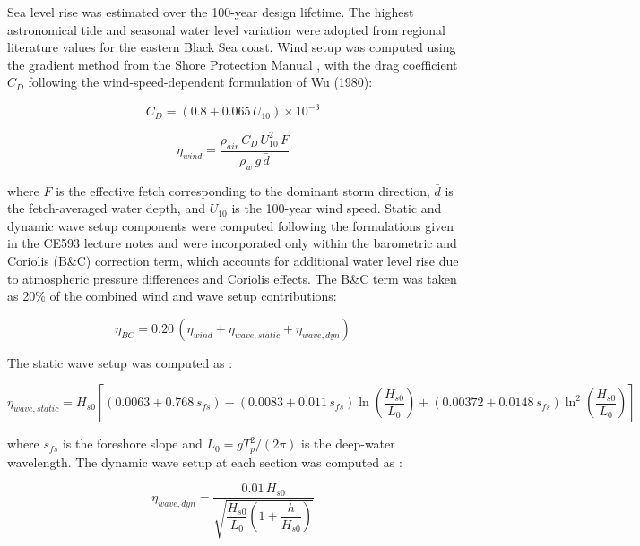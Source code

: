 \documentclass[a4paper, 11pt]{article}
\begin{document}
Sea level rise was estimated over the 100-year design lifetime. The highest astronomical tide and seasonal water level variation were adopted from regional literature values for the eastern Black Sea coast. Wind setup was computed using the 
gradient method from the Shore Protection Manual \cite{SPM1984}, 
with the drag coefficient $C_D$ following the wind-speed-dependent 
formulation of Wu (1980):

\begin{equation}
    C_D = (0.8 + 0.065\,U_{10}) \times 10^{-3}
\end{equation}

\begin{equation}
    \eta_{wind} = \frac{\rho_{air}\,C_D\,U_{10}^2\,F}
    {\rho_w\,g\,\bar{d}}
\end{equation}

where $F$ is the effective fetch corresponding to the dominant storm 
direction, $\bar{d}$ is the fetch-averaged water depth, and $U_{10}$ 
is the 100-year wind speed. Static and dynamic wave setup components were computed following the formulations given in the CE593 lecture notes \cite{CE593} and were incorporated only within the barometric and Coriolis 
(B\&C) correction term, which accounts for additional water level 
rise due to atmospheric pressure differences and Coriolis effects. 
The B\&C term was taken as 20\% of the combined wind and wave 
setup contributions:

\begin{equation}
    \eta_{BC} = 0.20\,(\eta_{wind} + \eta_{wave,static} + \eta_{wave,dyn})
\end{equation}

The static wave setup was computed as \cite{CE593}:

\begin{equation}
    \eta_{wave,static} = H_{s0} \left[ 
    (0.0063 + 0.768\,s_{fs}) 
    - (0.0083 + 0.011\,s_{fs})\ln\!\left(\frac{H_{s0}}{L_0}\right)
    + (0.00372 + 0.0148\,s_{fs})
    \ln^2\!\left(\frac{H_{s0}}{L_0}\right) \right]
\end{equation}

where $s_{fs}$ is the foreshore slope and $L_0 = gT_p^2/(2\pi)$ is 
the deep-water wavelength. The dynamic wave setup at each section 
was computed as \cite{CE593}:

\begin{equation}
    \eta_{wave,dyn} = \frac{0.01\,H_{s0}}
    {\sqrt{\dfrac{H_{s0}}{L_0}\left(1 + \dfrac{h}{H_{s0}}\right)}}
\end{equation}
\end{document}
